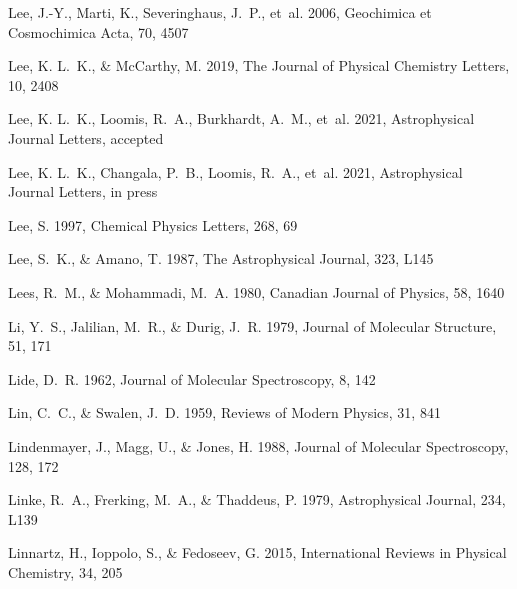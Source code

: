 \documentclass[twocolumn]{aastex631}
\begin{document}
\begin{thebibliography}{}
Lee, J.-Y., Marti, K., Severinghaus, J.~P., {et~al.} 2006, Geochimica et
  Cosmochimica Acta, 70, 4507

Lee, K. L.~K., \& McCarthy, M. 2019, The Journal of Physical Chemistry Letters,
  10, 2408

Lee, K. L.~K., Loomis, R.~A., Burkhardt, A.~M., {et~al.} 2021{},
  Astrophysical Journal Letters, accepted

Lee, K. L.~K., Changala, P.~B., Loomis, R.~A., {et~al.} 2021{},
  Astrophysical Journal Letters, in press

Lee, S. 1997, Chemical Physics Letters, 268, 69

Lee, S.~K., \& Amano, T. 1987, The Astrophysical Journal, 323, L145

Lees, R.~M., \& Mohammadi, M.~A. 1980, Canadian Journal of Physics, 58, 1640

Li, Y.~S., Jalilian, M.~R., \& Durig, J.~R. 1979, Journal of Molecular
  Structure, 51, 171

Lide, D.~R. 1962, Journal of Molecular Spectroscopy, 8, 142

Lin, C.~C., \& Swalen, J.~D. 1959, Reviews of Modern Physics, 31, 841

Lindenmayer, J., Magg, U., \& Jones, H. 1988, Journal of Molecular
  Spectroscopy, 128, 172

Linke, R.~A., Frerking, M.~A., \& Thaddeus, P. 1979, Astrophysical Journal,
  234, L139

Linnartz, H., Ioppolo, S., \& Fedoseev, G. 2015, International Reviews in
  Physical Chemistry, 34, 205


\end{thebibliography}
\end{document}
